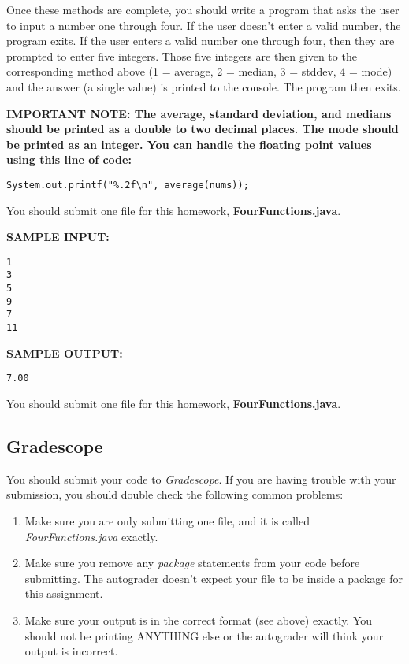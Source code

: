 \documentclass[paper=a4, fontsize=11pt, parskip=full]{scrartcl} %
\numberwithin{equation}{section} %
\numberwithin{figure}{section} %
\numberwithin{table}{section} %
\begin{document}
Once these methods are complete, you should write a program that asks the user to input a number one through four. If the user doesn't enter a valid number, the program exits. If the user enters a valid number one through four, then they are prompted to enter five integers. Those five integers are then given to the corresponding method above (1 = average, 2 = median, 3 = stddev, 4 = mode) and the answer (a single value) is printed to the console. The program then exits.

\textbf{IMPORTANT NOTE: The average, standard deviation, and medians should be printed as a double to two decimal places. The mode should be printed as an integer. You can handle the floating point values using this line of code:}

\begin{lstlisting}
System.out.printf("%.2f\n", average(nums));
\end{lstlisting}

You should submit one file for this homework, \textbf{FourFunctions.java}.

\textbf{SAMPLE INPUT:}

\begin{lstlisting}
1
3
5
9
7
11
\end{lstlisting}

\textbf{SAMPLE OUTPUT:}

\begin{lstlisting}
7.00
\end{lstlisting}

You should submit one file for this homework, \textbf{FourFunctions.java}.

\subsection{Gradescope}

You should submit your code to \emph{Gradescope}. If you are having trouble with your submission, you should double check the following common problems:

\begin{enumerate}
	\item Make sure you are only submitting one file, and it is called \emph{FourFunctions.java} exactly.
	\item Make sure you remove any \emph{package} statements from your code before submitting. The autograder doesn't expect your file to be inside a package for this assignment.
	\item Make sure your output is in the correct format (see above) exactly. You should not be printing ANYTHING else or the autograder will think your output is incorrect.
\end{enumerate}


\end{document}

